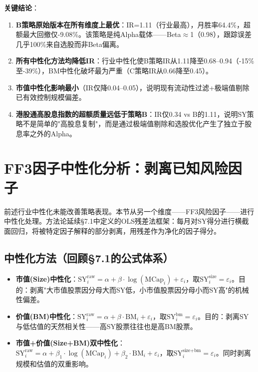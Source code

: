 \documentclass[10pt,a4paper]{ctexart}
\begin{document}
\textbf{关键结论}：
\begin{enumerate}[label=(\arabic*)]
    \item \textbf{B策略原始版本在所有维度上最优}：IR=1.11（行业最高），月胜率64.4\%，超额最大回撤仅-9.08\%。该策略是纯Alpha载体——Beta$\approx$1（0.98），跟踪误差几乎100\%来自选股而非Beta偏离。
    \item \textbf{所有中性化方法均降低IR}：行业中性化使B策略IR从1.11降至0.68--0.94（-15\%至-39\%），BM中性化破坏最为严重（C策略IR从0.66降至0.45）。
    \item \textbf{市值中性化影响最小}（IR仅降0.04--0.05），说明现有流动性过滤+极端值剔除已有效控制规模偏差。
    \item \textbf{港股通高股息指数的超额质量远低于策略B}：IR仅0.34 vs B的1.11，说明SY策略不是简单的"高股息复制"，而是通过极端值剔除和选股优化产生了独立于股息率之外的Alpha。
\end{enumerate}

\section{FF3因子中性化分析：剥离已知风险因子}

前述行业中性化未能改善策略表现。本节从另一个维度——FF3风险因子——进行中性化处理。方法论延续§7.1中定义的OLS残差法框架：每月对SY得分进行横截面回归，将被特定因子解释的部分剥离，用残差作为净化的因子得分。

\subsection{中性化方法（回顾§7.1的公式体系）}

\begin{itemize}
    \item \textbf{市值(Size)中性化}：$\text{SY}_i^{\text{raw}} = \alpha + \beta \cdot \log(\text{MCap}_i) + \varepsilon_i$，取$\text{SY}_i^{\text{size}} = \varepsilon_i$。目的：剥离"大市值股票因分母大而SY低，小市值股票因分母小而SY高"的机械性偏差。
    \item \textbf{价值(BM)中性化}：$\text{SY}_i^{\text{raw}} = \alpha + \beta \cdot \text{BM}_i + \varepsilon_i$，取$\text{SY}_i^{\text{bm}} = \varepsilon_i$。目的：剥离SY与低估值的天然相关性——高SY股票往往也是高BM股票。
    \item \textbf{市值+价值(Size+BM)双中性化}：$\text{SY}_i^{\text{raw}} = \alpha + \beta_1 \cdot \log(\text{MCap}_i) + \beta_2 \cdot \text{BM}_i + \varepsilon_i$，取$\text{SY}_i^{\text{size+bm}} = \varepsilon_i$。同时剥离规模和估值的双重影响。
\end{itemize}
\end{document}
